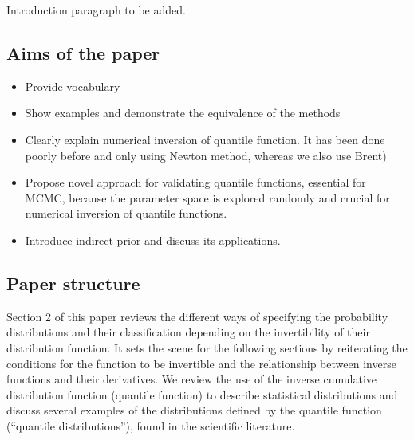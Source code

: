 \documentclass[
  12pt,
]{article}
\providecommand{\tightlist}{%
  \setlength{\itemsep}{0pt}\setlength{\parskip}{0pt}}
\begin{document}
Introduction paragraph to be added.

\hypertarget{aims-of-the-paper}{%
\subsection{Aims of the paper}\label{aims-of-the-paper}}

\begin{itemize}
\tightlist
\item
  Provide vocabulary
\item
  Show examples and demonstrate the equivalence of the methods
\item
  Clearly explain numerical inversion of quantile function. It has been done poorly before and only using Newton method, whereas we also use Brent)
\item
  Propose novel approach for validating quantile functions, essential for MCMC, because the parameter space is explored randomly and crucial for numerical inversion of quantile functions.
\item
  Introduce indirect prior and discuss its applications.
\end{itemize}

\hypertarget{paper-structure}{%
\subsection{Paper structure}\label{paper-structure}}

Section 2 of this paper reviews the different ways of specifying the probability distributions and their classification depending on the invertibility of their distribution function. It sets the scene for the following sections by reiterating the conditions for the function to be invertible and the relationship between inverse functions and their derivatives. We review the use of the inverse cumulative distribution function (quantile function) to describe statistical distributions and discuss several examples of the distributions defined by the quantile function (``quantile distributions''), found in the scientific literature.
\end{document}
